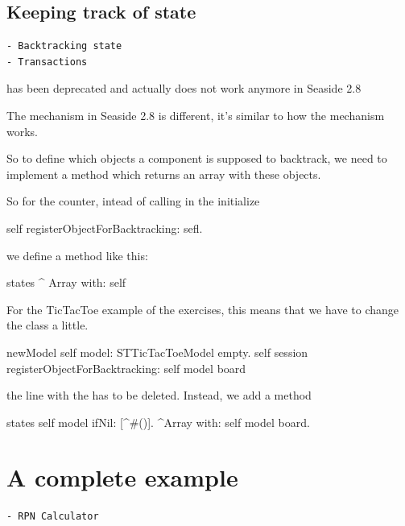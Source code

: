 \documentclass[a4paper,10pt,twoside]{book}
\begin{document}
\subsection{Keeping track of state}
\begin{verbatim}
- Backtracking state
- Transactions
\end{verbatim}


 has been deprecated and actually does not work
anymore in Seaside 2.8


The mechanism in Seaside 2.8 is different, it's similar to how the  mechanism works.

So to define which objects a component is supposed to backtrack, we need to implement a method  which returns an array with these objects.

So for the counter, intead of calling in the initialize

\begin{code}
	self registerObjectForBacktracking: sefl.
\end{code}

we define a method  like this:

\begin{code}
states
	^ Array with: self
\end{code}


For the TicTacToe example of the exercises, this means that we have to change
the class  a little.

\begin{code}
newModel
	self model: STTicTacToeModel empty.
	self session registerObjectForBacktracking: self model board
\end{code}

the line with the  has to be deleted. Instead, we add a method 

\begin{code}
states
	self model ifNil: [^#()].
	^Array with: self model board.
\end{code}



\section{A complete example}
\begin{verbatim}
- RPN Calculator
\end{verbatim}
\end{document}
